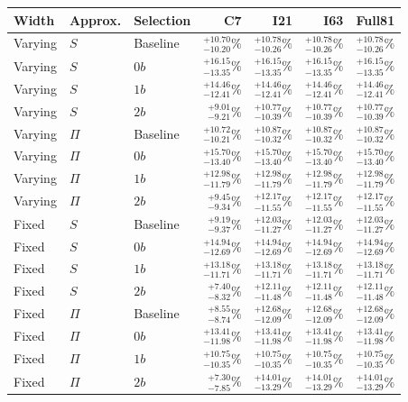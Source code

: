\begin{tabular}{lllrrrr}
\toprule
Width & Approx. & Selection & C7 & I21 & I63 & Full81 \\
\midrule
Varying & $S$ & Baseline & $^{+10.70}_{-10.20}\%$ & $^{+10.78}_{-10.26}\%$ & $^{+10.78}_{-10.26}\%$ & $^{+10.78}_{-10.26}\%$ \\
Varying & $S$ & $0b$ & $^{+16.15}_{-13.35}\%$ & $^{+16.15}_{-13.35}\%$ & $^{+16.15}_{-13.35}\%$ & $^{+16.15}_{-13.35}\%$ \\
Varying & $S$ & $1b$ & $^{+14.46}_{-12.41}\%$ & $^{+14.46}_{-12.41}\%$ & $^{+14.46}_{-12.41}\%$ & $^{+14.46}_{-12.41}\%$ \\
Varying & $S$ & $2b$ & $^{+9.01}_{-9.21}\%$ & $^{+10.77}_{-10.39}\%$ & $^{+10.77}_{-10.39}\%$ & $^{+10.77}_{-10.39}\%$ \\
Varying & $\Pi$ & Baseline & $^{+10.72}_{-10.21}\%$ & $^{+10.87}_{-10.32}\%$ & $^{+10.87}_{-10.32}\%$ & $^{+10.87}_{-10.32}\%$ \\
Varying & $\Pi$ & $0b$ & $^{+15.70}_{-13.40}\%$ & $^{+15.70}_{-13.40}\%$ & $^{+15.70}_{-13.40}\%$ & $^{+15.70}_{-13.40}\%$ \\
Varying & $\Pi$ & $1b$ & $^{+12.98}_{-11.79}\%$ & $^{+12.98}_{-11.79}\%$ & $^{+12.98}_{-11.79}\%$ & $^{+12.98}_{-11.79}\%$ \\
Varying & $\Pi$ & $2b$ & $^{+9.45}_{-9.34}\%$ & $^{+12.17}_{-11.55}\%$ & $^{+12.17}_{-11.55}\%$ & $^{+12.17}_{-11.55}\%$ \\
Fixed & $S$ & Baseline & $^{+9.19}_{-9.37}\%$ & $^{+12.03}_{-11.27}\%$ & $^{+12.03}_{-11.27}\%$ & $^{+12.03}_{-11.27}\%$ \\
Fixed & $S$ & $0b$ & $^{+14.94}_{-12.69}\%$ & $^{+14.94}_{-12.69}\%$ & $^{+14.94}_{-12.69}\%$ & $^{+14.94}_{-12.69}\%$ \\
Fixed & $S$ & $1b$ & $^{+13.18}_{-11.71}\%$ & $^{+13.18}_{-11.71}\%$ & $^{+13.18}_{-11.71}\%$ & $^{+13.18}_{-11.71}\%$ \\
Fixed & $S$ & $2b$ & $^{+7.40}_{-8.32}\%$ & $^{+12.11}_{-11.48}\%$ & $^{+12.11}_{-11.48}\%$ & $^{+12.11}_{-11.48}\%$ \\
Fixed & $\Pi$ & Baseline & $^{+8.55}_{-8.74}\%$ & $^{+12.68}_{-12.09}\%$ & $^{+12.68}_{-12.09}\%$ & $^{+12.68}_{-12.09}\%$ \\
Fixed & $\Pi$ & $0b$ & $^{+13.41}_{-11.98}\%$ & $^{+13.41}_{-11.98}\%$ & $^{+13.41}_{-11.98}\%$ & $^{+13.41}_{-11.98}\%$ \\
Fixed & $\Pi$ & $1b$ & $^{+10.75}_{-10.35}\%$ & $^{+10.75}_{-10.35}\%$ & $^{+10.75}_{-10.35}\%$ & $^{+10.75}_{-10.35}\%$ \\
Fixed & $\Pi$ & $2b$ & $^{+7.30}_{-7.85}\%$ & $^{+14.01}_{-13.29}\%$ & $^{+14.01}_{-13.29}\%$ & $^{+14.01}_{-13.29}\%$ \\
\bottomrule
\end{tabular}
